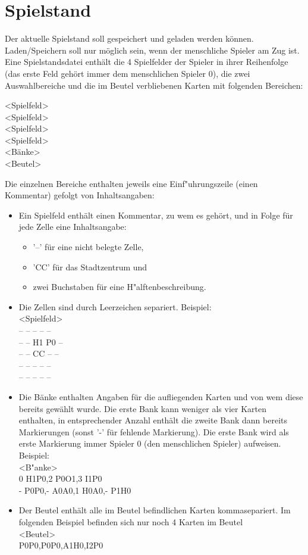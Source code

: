 \section{Spielstand}
Der aktuelle Spielstand soll gespeichert und geladen werden können. Laden/Speichern soll nur möglich sein, wenn der menschliche Spieler am Zug ist. Eine Spielstandsdatei enthält die 4 Spielfelder der Spieler in ihrer Reihenfolge (das erste Feld gehört immer dem menschlichen Spieler 0), die zwei Auswahlbereiche und die im Beutel verbliebenen Karten mit folgenden Bereichen:\\
\begin{center}
<Spielfeld>
\\<Spielfeld>
\\<Spielfeld>
\\<Spielfeld>
\\<Bänke>
\\<Beutel>\\
\end{center}
Die einzelnen Bereiche enthalten jeweils eine Einf"uhrungszeile (einen Kommentar) gefolgt von Inhaltsangaben:
\begin{itemize}
	\item Ein Spielfeld enthält einen Kommentar, zu wem es gehört, und in Folge für jede Zelle eine Inhaltsangabe:
	\begin{itemize}
		\item '--' für eine nicht belegte Zelle,
		\item 'CC' für das Stadtzentrum und
		\item zwei Buchstaben für eine H"alftenbeschreibung.
	\end{itemize}
	\item Die Zellen sind durch Leerzeichen separiert. Beispiel:
	\\ <Spielfeld>
	\\-- -- -- -- --
	\\-- -- H1 P0 --
	\\-- -- CC -- --
	\\-- -- -- -- --
	\\-- -- -- -- --
	\item Die Bänke enthalten Angaben für die aufliegenden Karten und von wem diese bereits gewählt wurde. Die erste Bank kann weniger als vier Karten enthalten, in entsprechender Anzahl enthält die zweite Bank dann bereits Markierungen (sonst '-' für fehlende Markierung). Die erste Bank wird als erste Markierung immer Spieler 0 (den menschlichen Spieler) aufweisen. Beispiel:
	\\<B"anke>
  \\0 H1P0,2 P0O1,3 I1P0
  \\- P0P0,- A0A0,1 H0A0,- P1H0
  \item Der Beutel enthält alle im Beutel befindlichen Karten kommasepariert. Im folgenden Beispiel befinden sich nur noch 4 Karten im Beutel
  \\<Beutel>
  \\P0P0,P0P0,A1H0,I2P0
\end{itemize}


